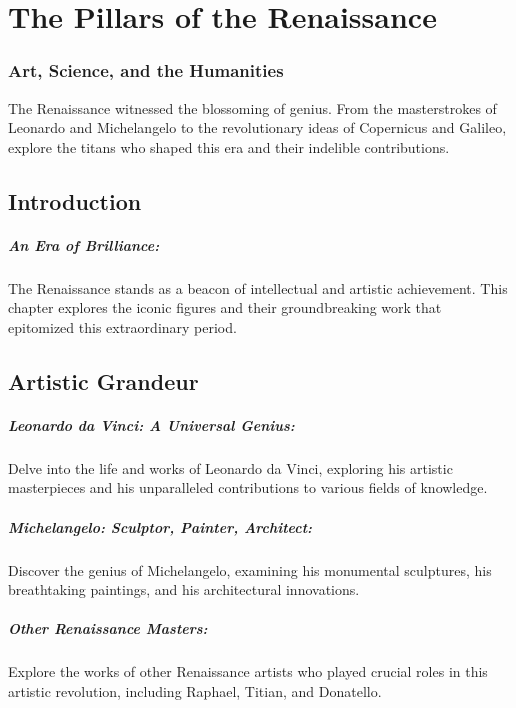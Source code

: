 \documentclass[a4paper,12pt]{book}
\begin{document}
\chapter{The Pillars of the Renaissance}
\subsection*{Art, Science, and the Humanities}
The Renaissance witnessed the blossoming of genius. From the masterstrokes of Leonardo and Michelangelo to the revolutionary ideas of Copernicus and Galileo, explore the titans who shaped this era and their indelible contributions.

\section*{Introduction}

\paragraph{An Era of Brilliance:}
The Renaissance stands as a beacon of intellectual and artistic achievement. This chapter explores the iconic figures and their groundbreaking work that epitomized this extraordinary period.

\section*{Artistic Grandeur}

\paragraph{Leonardo da Vinci: A Universal Genius:}
Delve into the life and works of Leonardo da Vinci, exploring his artistic masterpieces and his unparalleled contributions to various fields of knowledge.

\paragraph{Michelangelo: Sculptor, Painter, Architect:}
Discover the genius of Michelangelo, examining his monumental sculptures, his breathtaking paintings, and his architectural innovations.

\paragraph{Other Renaissance Masters:}
Explore the works of other Renaissance artists who played crucial roles in this artistic revolution, including Raphael, Titian, and Donatello.
\end{document}
